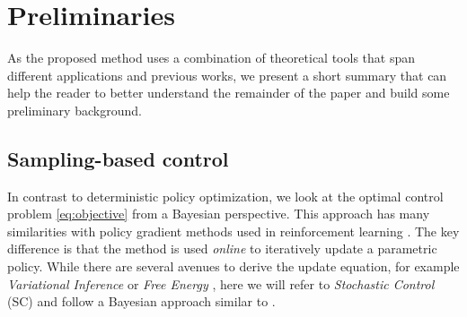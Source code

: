 \section{Preliminaries} \label{sec:theory}

As the proposed method uses a combination of theoretical tools that span different applications and previous works, we present a short summary that can help the reader to better understand the remainder of the paper and build some preliminary background.

\subsection{Sampling-based control}
In contrast to deterministic policy optimization, we look at the optimal control problem \eqref{eq:objective} from a Bayesian perspective. This approach has many similarities with policy gradient methods used in reinforcement learning \cite{williams1992simple}. The key difference is that the method is used \emph{online} to iteratively update a parametric policy. While there are several avenues to derive the update equation, for example \emph{Variational Inference} \cite{lambert_stein_2020} or \emph{Free Energy} \cite{williams_information_2017}, here we will refer to \emph{Stochastic Control} (SC) and follow a Bayesian approach similar to \cite{levine2018reinforcement}. 

